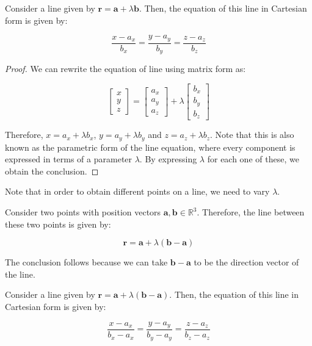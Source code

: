 \documentclass[12pt]{article}
\begin{document}
\begin{proposition}
    Consider a line given by $\mathbf{r} = \mathbf{a} + \lambda \mathbf{b}$. Then, the equation of this line in Cartesian form is given by:

    \[ \frac{x - a_x}{b_x} = \frac{y - a_y}{b_y} = \frac{z - a_z}{b_z} \]
\end{proposition}

\begin{proof}
    We can rewrite the equation of line using matrix form as:

    \[ \begin{bmatrix}
        x \\
        y \\
        z
    \end{bmatrix} = \begin{bmatrix}
        a_x \\
        a_y \\
        a_z
    \end{bmatrix} + \lambda \begin{bmatrix}
        b_x \\
        b_y \\
        b_z
    \end{bmatrix} \]

    Therefore, $x = a_x + \lambda b_x$, $y = a_y + \lambda b_y$ and $z = a_z + \lambda b_z$. Note that this is also known as the parametric form of the line equation, where every component is expressed in terms of a parameter $\lambda$. By expressing $\lambda$ for each one of these, we obtain the conclusion. 
\end{proof}

Note that in order to obtain different points on a line, we need to vary $\lambda$.

\begin{proposition}
    Consider two points with position vectors $\mathbf{a, b} \in \mathbb{R}^3$. Therefore, the line between these two points is given by:

    \[ \mathbf{r} = \mathbf{a} + \lambda (\mathbf{b - a}) \]
\end{proposition}

The conclusion follows because we can take $\mathbf{b - a}$ to be the direction vector of the line.

\begin{proposition}
    Consider a line given by $\mathbf{r} = \mathbf{a} + \lambda \mathbf{(b - a)}$. Then, the equation of this line in Cartesian form is given by:

    \[ \frac{x - a_x}{b_x - a_x} = \frac{y - a_y}{b_y - a_y} = \frac{z - a_z}{b_z - a_z} \]
\end{proposition}
\end{document}
